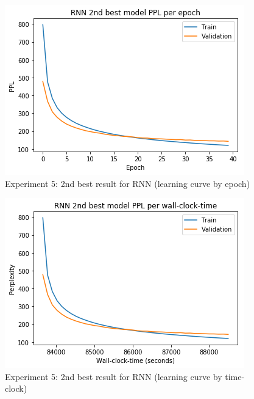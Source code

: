 \begin{itemize}
	\begin{figure}[H]
		\centering
		\includegraphics[scale=0.8]{Q4-3_RNN_2epoch.png}
		\caption{Experiment 5: 2nd best result for RNN (learning curve by epoch)}
		\label{fig:fig21}
	\end{figure}
\begin{figure}[H]
	\centering
	\includegraphics[scale=0.8]{Q4-3_RNN_2time.png}
	\caption{Experiment 5: 2nd best result for RNN (learning curve by time-clock)}
	\label{fig:fig21b}
\end{figure}
	

\end{itemize}
